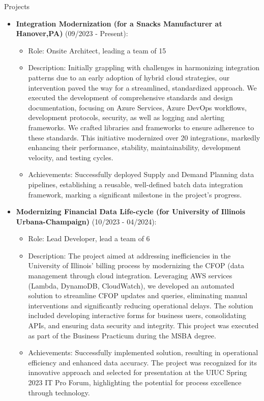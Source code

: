 \documentclass{resume} %
\begin{document}
    \begin{rSection}{Projects}
            \begin{itemize}
            \item \textbf{Integration Modernization (for a Snacks Manufacturer at Hanover,PA)} (09/2023 - Present):
            \begin{itemize}
                \item Role: Onsite Architect, leading a team of 15
                \item Description: Initially grappling with challenges in harmonizing integration patterns due to an early adoption of hybrid cloud strategies, our intervention paved the way for a streamlined, standardized approach. We executed the development of comprehensive standards and design documentation, focusing on Azure Services, Azure DevOps workflows, development protocols, security, as well as logging and alerting frameworks. We crafted libraries and frameworks to ensure adherence to these standards. This initiative modernized over 20 integrations, markedly enhancing their performance, stability, maintainability, development velocity, and testing cycles.
                \item Achievements: Successfully deployed Supply and Demand Planning data pipelines, establishing a reusable, well-defined batch data integration framework, marking a significant milestone in the project’s progress. 
            \end{itemize}
        \end{itemize}

            \begin{itemize}
            \item \textbf{Modernizing Financial Data Life-cycle (for University of Illinois Urbana-Champaign)} (10/2023 - 04/2024):
            \begin{itemize}
                \item Role: Lead Developer, lead a team of 6
                \item Description: The project aimed at addressing inefficiencies in the University of Illinois' billing process by modernizing the CFOP (data management through cloud integration. Leveraging AWS services (Lambda, DynamoDB, CloudWatch), we developed an automated solution to streamline CFOP updates and queries, eliminating manual interventions and significantly reducing operational delays. The solution included developing interactive forms for business users, consolidating APIs, and ensuring data security and integrity. This project was executed as part of the Business Practicum during the MSBA degree.
                \item Achievements: Successfully implemented solution, resulting in operational efficiency and enhanced data accuracy. The project was recognized for its innovative approach and selected for presentation at the UIUC Spring 2023 IT Pro Forum, highlighting the potential for process excellence through technology.
            \end{itemize}
        \end{itemize}


\end{rSection}
\end{document}
